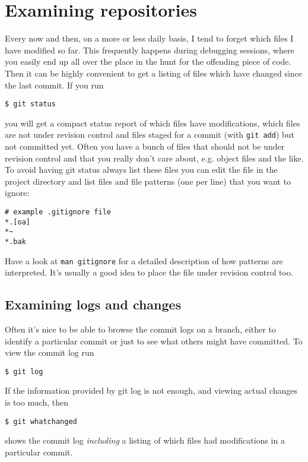 \documentclass[a4paper,10pt]{article}
\begin{document}
\section{Examining repositories}
\label{sec:examine}
Every now and then, on a more or less daily basis, I tend to forget which
files I have modified so far. This frequently happens during debugging
sessions, where you easily end up all over the place in the hunt for the
offending piece of code. Then it can be highly convenient to get a listing 
of files which have changed since the last commit. If you run
\begin{verbatim}
$ git status
\end{verbatim}
you will get a compact status report of which files have modifications, which
files are not under revision control and files staged for a commit (with
\texttt{git add}) but not committed yet. Often you have a bunch of files that
should not be under revision control and that you really don't care about,
e.g.  object files and the like. To avoid having git status always list these
files you can edit the file  in the project directory and
list files and file patterns (one per line) that you want to ignore:
\begin{verbatim}
# example .gitignore file
*.[oa]
*~
*.bak

\end{verbatim}
Have a look at \texttt{man gitignore} for a detailed description of how 
patterns are interpreted.
It's usually a good idea to place the  file under revision 
control too. 

\subsection{Examining logs and changes}
Often it's nice to be able to browse the commit logs on a branch, either
to identify a particular commit or just to see what others might have
committed. To view the commit log run
\begin{verbatim}
$ git log
\end{verbatim}
If the information provided by git log is not enough, and viewing actual
changes is too much, then
\begin{verbatim}
$ git whatchanged
\end{verbatim}
shows the commit log \emph{including} a listing of which files had
modifications in a particular commit. 
\end{document}
